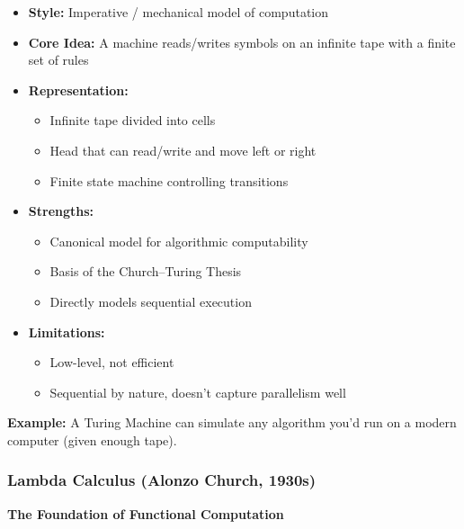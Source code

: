 \begin{itemize}
\item \textbf{Style:} Imperative / mechanical model of computation
\item \textbf{Core Idea:} A machine reads/writes symbols on an infinite tape with a finite set of rules
\item \textbf{Representation:}
\begin{itemize}
\item Infinite tape divided into cells
\item Head that can read/write and move left or right
\item Finite state machine controlling transitions
\end{itemize}
\item \textbf{Strengths:}
\begin{itemize}
\item Canonical model for algorithmic computability
\item Basis of the Church–Turing Thesis
\item Directly models sequential execution
\end{itemize}
\item \textbf{Limitations:}
\begin{itemize}
\item Low-level, not efficient
\item Sequential by nature, doesn't capture parallelism well
\end{itemize}
\end{itemize}

\textbf{Example:} A Turing Machine can simulate any algorithm you'd run on a modern computer (given enough tape).

\subsubsection{Lambda Calculus (Alonzo Church, 1930s)}

\textbf{The Foundation of Functional Computation}

